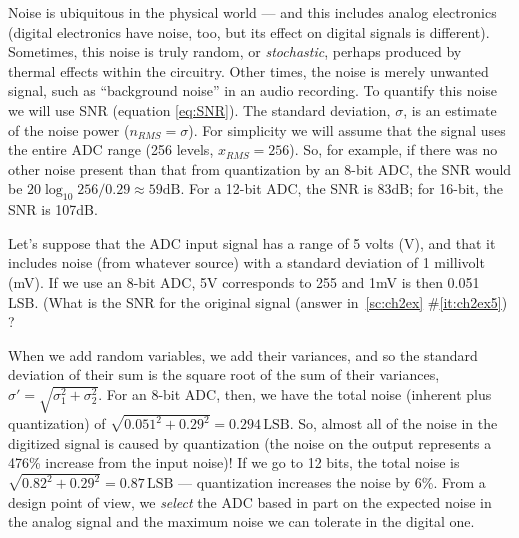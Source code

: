 Noise is ubiquitous in the physical world --- and this includes
analog electronics (digital electronics have noise, too, but its
effect on digital signals is different). Sometimes, this noise is
truly random, or \emph{stochastic}, perhaps produced by thermal
effects within the circuitry. Other times, the noise is merely
unwanted signal, such as ``background noise'' in an audio recording.
To quantify this noise we will use SNR (equation \ref{eq:SNR}). The standard deviation, $\sigma$, is an estimate of the noise power ($n_{RMS}=\sigma$). For simplicity we will assume that the signal uses the entire ADC range (256 levels, $x_{RMS}=256$).
So, for example, if there was no other noise
present than that from quantization by an 8-bit ADC, the SNR would be
$20 \log_{10} 256/0.29 \approx 59\mathrm{dB}$. For a 12-bit ADC, the SNR is
83dB; for 16-bit, the SNR is 107dB.

Let's suppose that the ADC input signal has a range of 5 volts (V),
and that it includes noise (from whatever source) with a standard
deviation of 1 millivolt (mV). If we use an 8-bit ADC, 5V corresponds
to 255 and 1mV is then 0.051 LSB. (What is the SNR for the original
signal (answer in~\ref{sc:ch2ex} \#\ref{it:ch2ex5}) ? 

When we add
random variables, we add their variances, and so the standard
deviation of their sum is the square root of the sum of their
variances, $\sigma' = \sqrt{\sigma_1^2 + \sigma_2^2}$. For an 8-bit
ADC, then, we have the total noise (inherent plus quantization) of
$\sqrt{0.051^2 + 0.29^2} = 0.294 \, \textrm{LSB}$. So, almost all of
the noise in the digitized signal is caused by quantization (the noise
on the output represents a 476\% increase from the input noise)! If we
go to 12 bits, the total noise is $\sqrt{0.82^2 + 0.29^2} = 0.87 \,
\textrm{LSB}$ --- quantization increases the noise by 6\%. From a
design point of view, we \emph{select} the ADC based in part on the
expected noise in the analog signal and the maximum noise we can
tolerate in the digital one.  

